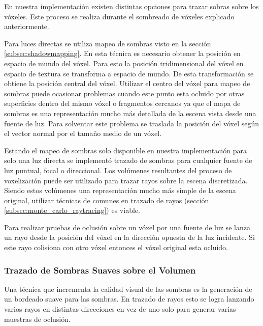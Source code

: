 En nuestra implementación existen distintas opciones para trazar sobras sobre los vóxeles. Este proceso se realiza durante el sombreado de vóxeles explicado anteriormente.

Para luces directas se utiliza mapeo de sombras visto en la sección \ref{subsec:shadowmapping}. En  esta técnica es necesario obtener la posición en espacio de mundo del vóxel. Para esto la posición tridimensional del vóxel en espacio de textura se transforma a espacio de mundo. De esta transformación se obtiene la posición central del vóxel. Utilizar el centro del vóxel para mapeo de sombras puede ocasionar problemas cuando este punto esta ocluido por otras superficies dentro del mismo vóxel o fragmentos cercanos ya que el mapa de sombras es una representación mucho más detallada de la escena vista desde una fuente de luz. Para solventar este problema se traslada la posición del vóxel según el vector normal por el tamaño medio de un vóxel.

Estando el mapeo de sombras solo disponible en nuestra implementación para solo una luz directa se implementó trazado de sombras para cualquier fuente de luz puntual, focal o direccional. Los volúmenes resultantes del proceso de voxelización puede ser utilizado para trazar rayos sobre la escena discretizada. Siendo estos volúmenes una representación mucho más simple de la escena original, utilizar técnicas de comunes en trazado de rayos (sección \ref{subsec:monte_carlo_raytracing}) es viable.

Para realizar pruebas de oclusión sobre un vóxel por una fuente de luz se lanza un rayo desde la posición del vóxel en la dirección opuesta de la luz incidente. Si este rayo colisiona con otro vóxel entonces el vóxel original esta ocluido.

\subsubsection{Trazado de Sombras Suaves sobre el Volumen}

Una técnica que incrementa la calidad visual de las sombras es la generación de un bordeado suave para las sombras. En trazado de rayos esto se logra lanzando varios rayos en distintas direcciones en vez de uno solo para generar varias muestras de oclusión.


